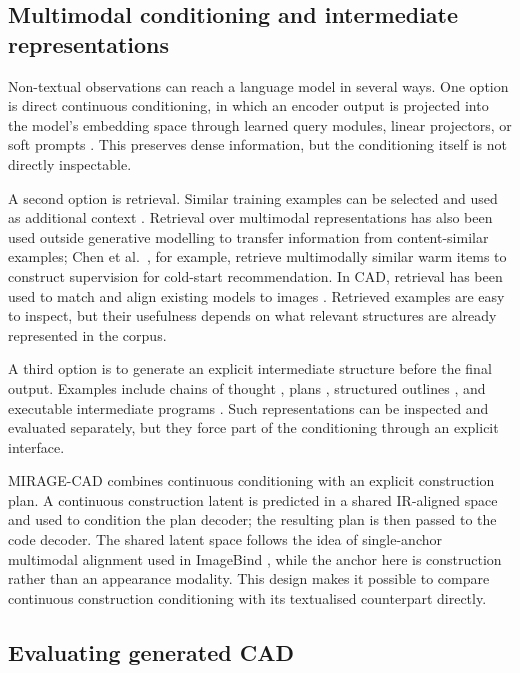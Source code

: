 \documentclass[preprint,12pt]{elsarticle}
\begin{document}
\subsection{Multimodal conditioning and intermediate representations}

Non-textual observations can reach a language model in several ways.
One option is direct continuous conditioning, in which an encoder output is
projected into the model's embedding space through learned query modules,
linear projectors, or soft prompts
\cite{li2023blip2,liu2023llava,li2021prefixtuning,lester2021prompttuning}.
This preserves dense information, but the conditioning itself is not directly
inspectable.

A second option is retrieval. Similar training examples can be selected and
used as additional context
\cite{lewis2020rag,khandelwal2020knnlm}. Retrieval over multimodal
representations has also been used outside generative modelling to transfer
information from content-similar examples; Chen et al.~\cite{chen2026denoisingimplicitfeedbackcoldstart},
for example, retrieve multimodally similar warm items to construct supervision
for cold-start recommendation. In CAD, retrieval has been used to match and
align existing models to images \cite{gao2024diffcad}. Retrieved examples are
easy to inspect, but their usefulness depends on what relevant structures are
already represented in the corpus.

A third option is to generate an explicit intermediate structure before the
final output. Examples include chains of thought
\cite{wei2022cot}, plans \cite{jiang2024selfplanning}, structured outlines
\cite{li2025scot}, and executable intermediate programs
\cite{gao2023pal}. Such representations can be inspected and evaluated
separately, but they force part of the conditioning through an explicit
interface.

MIRAGE-CAD combines continuous conditioning with an explicit construction
plan. A continuous construction latent is predicted in a shared IR-aligned
space and used to condition the plan decoder; the resulting plan is then
passed to the code decoder. The shared latent space follows the idea of
single-anchor multimodal alignment used in ImageBind
\cite{girdhar2023imagebind}, while the anchor here is construction rather than
an appearance modality. This design makes it possible to compare continuous
construction conditioning with its textualised counterpart directly.

\subsection{Evaluating generated CAD}
\end{document}
